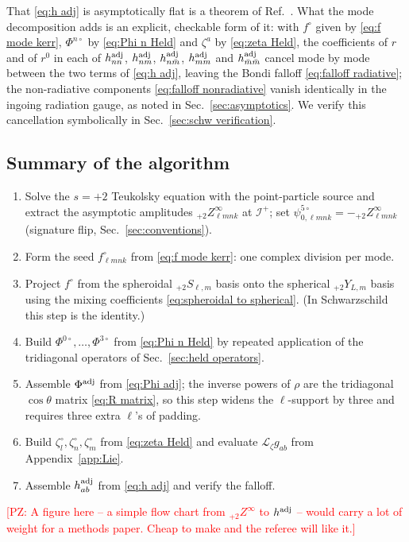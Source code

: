 \documentclass[preprint,aps,nofootinbib,a4paper,superscriptaddress,longbibliography,amsfonts, amssymb,amsmath,titlepage]{revtex4-1}
\numberwithin{equation}{section} %
\newcommand{\PZ}[1]{\textcolor{red}{\textsf{[PZ: #1]}}}
\newcommand{\emm}{m}
\def\l{\ensuremath{\ell}}
\newcommand{\Lie}{{\mathcal L}}
\def\fHo{f^{\circ}}
\newcommand{\PhiN}[1]{\Phi^{#1\circ}}
\def\Phiadj{\Phi^{\rm adj}}
\newcommand{\Zinf}[2]{{}_{#1}Z^{\infty}_{#2}}
\newcommand{\psifiveM}[1]{\psi^{5\circ}_{0,#1}}       %
\def\zetal{\zeta^{\circ}_{l}}
\def\zetan{\zeta^{\circ}_{n}}
\def\zetam{\zeta^{\circ}_{m}}
\def\lmnk{\l \emm n k}
\newcommand{\sYY}[3]{{}_{#1}Y_{#2,#3}}
\newcommand{\sSS}[3]{{}_{#1}S_{#2,#3}}
\def\scri{\mathscr{I}^{+}}
\begin{document}
That \eqref{eq:h adj} is asymptotically flat is a theorem of
Ref.~\cite{Hollands:2024iqp}.  What the mode decomposition adds is an
explicit, checkable form of it: with $\fHo$ given by \eqref{eq:f mode kerr},
$\PhiN{n}$ by \eqref{eq:Phi n Held} and $\zeta^{a}$ by
\eqref{eq:zeta Held}, the coefficients of $r$ and of $r^{0}$ in each of
$h^{\rm adj}_{nn}$, $h^{\rm adj}_{nm}$, $h^{\rm adj}_{n\bar m}$,
$h^{\rm adj}_{mm}$ and $h^{\rm adj}_{\bar m\bar m}$ cancel mode by mode
between the two terms of \eqref{eq:h adj}, leaving the Bondi falloff
\eqref{eq:falloff radiative}; the non-radiative components
\eqref{eq:falloff nonradiative} vanish identically in the ingoing radiation
gauge, as noted in Sec.~\ref{sec:asymptotics}.  We verify this cancellation
symbolically in Sec.~\ref{sec:schw verification}.

\subsection{Summary of the algorithm}
\label{sec:algorithm}
\begin{enumerate}[label=\textbf{Step \arabic*.},leftmargin=*]
\item Solve the $s=+2$ Teukolsky equation with the point-particle source and
extract the asymptotic amplitudes $\Zinf{+2}{\lmnk}$ at $\scri$; set
$\psifiveM{\lmnk} = -\Zinf{+2}{\lmnk}$ (signature flip, Sec.~\ref{sec:conventions}).
\item Form the seed $\fHo_{\lmnk}$ from \eqref{eq:f mode kerr}: one complex
division per mode.
\item Project $\fHo$ from the spheroidal $\sSS{+2}{\l}{\emm}$ basis onto the
spherical $\sYY{+2}{L}{\emm}$ basis using the mixing coefficients
\eqref{eq:spheroidal to spherical}.  (In Schwarzschild this step is the
identity.)
\item Build $\PhiN{0},\dots,\PhiN{3}$ from \eqref{eq:Phi n Held} by repeated
application of the tridiagonal operators of Sec.~\ref{sec:held operators}.
\item Assemble $\Phiadj$ from \eqref{eq:Phi adj}; the inverse powers of
$\rho$ are the tridiagonal $\cos\theta$ matrix \eqref{eq:R matrix}, so this
step widens the $\l$-support by three and requires three extra $\l$'s of
padding.
\item Build $\zetal,\zetan,\zetam$ from \eqref{eq:zeta Held} and evaluate
$\Lie_{\zeta}g_{ab}$ from Appendix~\ref{app:Lie}.
\item Assemble $h^{\rm adj}_{ab}$ from \eqref{eq:h adj} and verify the
falloff.
\end{enumerate}
\PZ{A figure here -- a simple flow chart from $\Zinf{+2}{}$ to $h^{\rm adj}$ --
would carry a lot of weight for a methods paper.  Cheap to make and the
referee will like it.}
\end{document}
